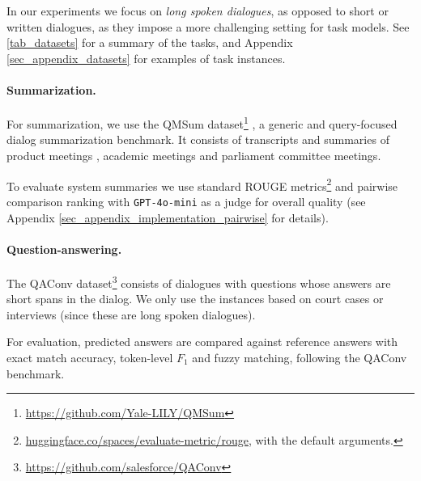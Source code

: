 In our experiments we focus on \textit{long spoken dialogues}, as opposed to short or written dialogues, as they impose a more challenging setting for task models.
See \autoref{tab_datasets} for a summary of the tasks, and Appendix \ref{sec_appendix_datasets} for examples of task instances.

\paragraph{Summarization.}
For summarization, we use the QMSum dataset\footnote{\url{https://github.com/Yale-LILY/QMSum}} \citep{zhong-etal-2021-qmsum}, a generic and query-focused dialog summarization benchmark. It consists of transcripts and summaries of product meetings \citep[AMI;][]{carletta2006ami}, academic meetings \citep[ICSI;][]{janin2003icsi} and parliament committee meetings.

To evaluate system summaries we use standard ROUGE metrics\footnote{\url{huggingface.co/spaces/evaluate-metric/rouge}, with the default arguments.} \citep{lin-2004-rouge} and pairwise comparison ranking \citep{qin-etal-2024-large} with \texttt{GPT-4o-mini} as a judge for overall quality \citep{liu-etal-2024-benchmarking} (see Appendix \ref{sec_appendix_implementation_pairwise} for details).

\paragraph{Question-answering.}
The QAConv dataset\footnote{\url{https://github.com/salesforce/QAConv}} \citep{wu-etal-2022-qaconv} consists of dialogues with questions whose answers are short spans in the dialog. We only use the instances based on court cases or interviews (since these are long spoken dialogues).

For evaluation, predicted answers are compared against reference answers with exact match accuracy, token-level $F_1$ and fuzzy matching, following the QAConv benchmark.

